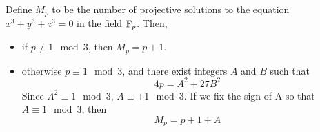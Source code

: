 
\begin{theorem}
Define $M_p$ to be the number of projective solutions to the equation $x^3 + y^3 + z^3 = 0$ in the field $\mathbb{F}_p$. Then,
\begin{itemize}
\item if $p \not\equiv 1 \mod{3}$, then $M_p = p + 1$.
\item otherwise $p \equiv 1 \mod{3}$, and there exist integers $A$ and $B$ such that
	$$4p = A^2 + 27B^2$$
	Since $A^2 \equiv 1 \mod{3}$, $A \equiv \pm1 \mod{3}$. If we fix the sign of A so that $A \equiv 1 \mod{3}$, then
	$$M_p = p + 1 + A$$
\end{itemize}
\end{theorem}

